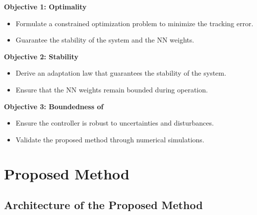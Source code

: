 \documentclass[8pt, aspectratio=169]{beamer}
\begin{document}
\begin{frame}{\insertsubsectionhead}

  \textbf{Objective 1: Optimality}
  \begin{itemize}
    \item Formulate a constrained optimization problem to minimize the tracking error.
    \item Guarantee the stability of the system and the NN weights.
  \end{itemize}

  \textbf{Objective 2: Stability}
  \begin{itemize}
    \item Derive an adaptation law that guarantees the stability of the system.
    \item Ensure that the NN weights remain bounded during operation.
  \end{itemize}

  \textbf{Objective 3: Boundedness of }
  \begin{itemize}
    \item Ensure the controller is robust to uncertainties and disturbances.
    \item Validate the proposed method through numerical simulations.
  \end{itemize}

\end{frame}

\section{Proposed Method}

\subsection{Architecture of the Proposed Method}
\end{document}
